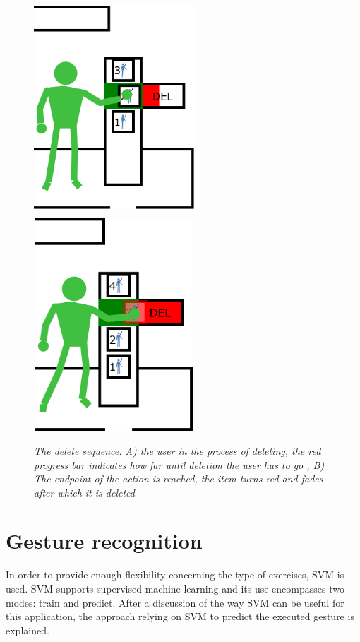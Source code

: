 \begin{figure}[H]
	\begin{center}
		\includegraphics[width=6cm, height=8cm]{figures/12_delete_progress.png}
		\includegraphics[width=6cm, height=8cm]{figures/13_delete_complete.png}
		\caption{\emph{The delete sequence: A) the user in the process of deleting, the red progress bar indicates how far until deletion the user has to go , B) The endpoint of the action is reached, the item turns red and fades after which it is deleted}}
		\label{delete functionality}
	\end{center}
\end{figure}


\section{Gesture recognition}

In order to provide enough flexibility concerning the type of exercises, SVM is used. SVM supports supervised machine learning and its use encompasses two modes: train and predict. After a discussion of the way SVM can be useful for this application, the approach relying on SVM to predict the executed gesture is explained.\\


